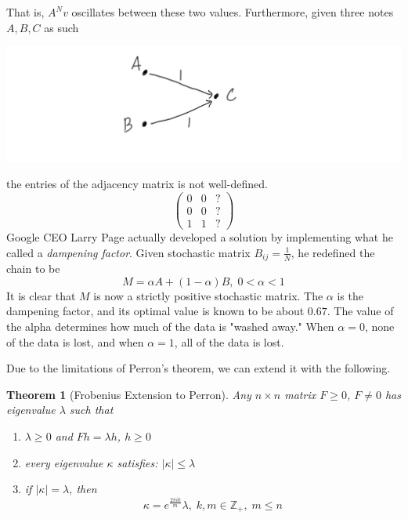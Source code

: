 \documentclass{article}
\newtheorem{theorem}{Theorem}[section]
\theoremstyle{remark}
\theoremstyle{definition}
\begin{document}
That is, $A^N v$ oscillates between these two values. Furthermore, given three notes $A, B, C$ as such
\begin{center}
    \includegraphics[scale=0.25]{img/Degeneratre_Markov_Chain.PNG} 
\end{center}
the entries of the adjacency matrix is not well-defined. 
\[ \begin{pmatrix} 0&0&? \\0&0&? \\1&1&?\end{pmatrix}\]
Google CEO Larry Page actually developed a solution by implementing what he called a \textit{dampening factor}. Given stochastic matrix $B_{i j} = \frac{1}{N}$, he redefined the chain to be 
\[M = \alpha A + (1-\alpha) B, \; 0< \alpha < 1\]
It is clear that $M$ is now a strictly positive stochastic matrix. The $\alpha$ is the dampening factor, and its optimal value is known to be about $0.67$. The value of the alpha determines how much of the data is "washed away." When $\alpha = 0$, none of the data is lost, and when $\alpha = 1$, all of the data is lost. 

Due to the limitations of Perron's theorem, we can extend it with the following.

\begin{theorem}[Frobenius Extension to Perron]
Any $n \times n$ matrix $F \geq 0$, $F \neq 0$ has eigenvalue $\lambda$ such that
\begin{enumerate}
    \item $\lambda \geq 0$ and $F h = \lambda h$, $h\geq 0$ \item every eigenvalue $\kappa$ satisfies: $|\kappa| \leq \lambda$ 
    \item if $|\kappa| = \lambda$, then 
\[\kappa = e^{\frac{2 \pi i k}{m}} \lambda, \; k, m \in \mathbb{Z}_+, \; m \leq n\]
\end{enumerate}
\end{theorem}
\end{document}
